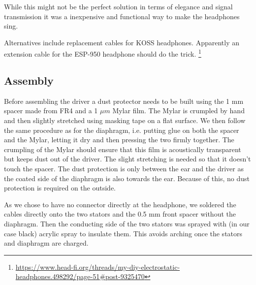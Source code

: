 \documentclass{article}
\begin{document}
While this might not be the perfect solution in terms of elegance and signal transmission it was a inexpensive and functional way to make the headphones sing.

Alternatives include replacement cables for KOSS headphones. Apparently an extension cable for the ESP-950 headphone should do the trick. \footnote{\url{https://www.head-fi.org/threads/my-diy-electrostatic-headphones.498292/page-51#post-9325470}}


\subsection{Assembly}
\label{s:driver:assembly}
Before assembling the driver a dust protector needs to be built using the 1 mm spacer made from FR4 and a 1 $\mu m$ Mylar film. The Mylar is crumpled by hand and then slightly stretched using masking tape on a flat surface. We then follow the same procedure as for the diaphragm, i.e. putting glue on both the spacer and the Mylar, letting it dry and then pressing the two firmly together. The crumpling of the Mylar should ensure that this film is acoustically transparent but keeps dust out of the driver. The slight stretching is needed so that it doesn't touch the spacer. The dust protection is only between the ear and the driver as the coated side of the diaphragm is also towards the ear. Because of this, no dust protection is required on the outside.

As we chose to have no connector directly at the headphone, we soldered the cables directly onto the two stators and the 0.5 mm front spacer without the diaphragm. Then the conducting side of the two stators was sprayed with (in our case black) acrylic spray to insulate them. This avoids arching once the stators and diaphragm are charged.
\end{document}
